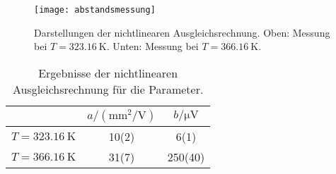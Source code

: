 \begin{figure}
  \centering
  \texttt{[image: abstandsmessung]}
  \caption{Darstellungen der nichtlinearen Ausgleichsrechnung. Oben:
    Messung bei $T = \SI{323.16}{\kelvin}$. Unten: Messung bei $T =
    \SI{366.16}{\kelvin}$.}
  \label{fig:abstand}
\end{figure}

\begin{table}
  \centering
  \begin{tabular}{lSS[table-figures-decimal = 2]}
    \toprule
    & {$a/(\si{\milli\metre\squared\per\volt})$} &
    {$b/\si{\micro\volt}$} \\
    \midrule
    $T = \SI{323.16}{\kelvin}$ & 10(2) & 6(1)\\
    $T = \SI{366.16}{\kelvin}$ & 31(7) & 250(40)\\
    \bottomrule
  \end{tabular}
  \caption{Ergebnisse der nichtlinearen Ausgleichsrechnung für die Parameter.}
  \label{tab:param}
\end{table}

